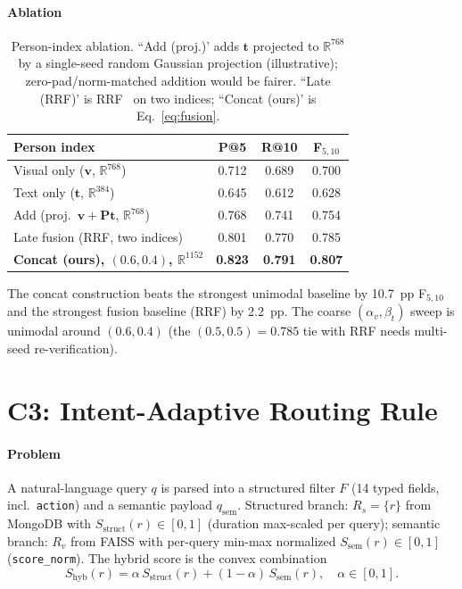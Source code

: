 ﻿\documentclass[conference]{IEEEtran}
\theoremstyle{plain}
\begin{document}
\paragraph*{Ablation}
\begin{table}[!t]
\caption{Person-index ablation. ``Add (proj.)' adds $\mathbf{t}$ projected to $\mathbb{R}^{768}$ by a single-seed random Gaussian projection (illustrative); zero-pad/norm-matched addition would be fairer. ``Late (RRF)' is RRF~\cite{b27} on two indices; ``Concat (ours)' is Eq.~\eqref{eq:fusion}.}
\label{tab:fusion_ablation}
\centering
\footnotesize
\begin{tabular}{@{}lccc@{}}
\toprule
Person index & P@5 & R@10 & F$_{5,10}$ \\
\midrule
Visual only ($\mathbf{v}$, $\mathbb{R}^{768}$) & 0.712 & 0.689 & 0.700 \\
Text only ($\mathbf{t}$, $\mathbb{R}^{384}$) & 0.645 & 0.612 & 0.628 \\
Add (proj.\ $\mathbf{v}+\mathbf{P}\mathbf{t}$, $\mathbb{R}^{768}$) & 0.768 & 0.741 & 0.754 \\
Late fusion (RRF, two indices) & 0.801 & 0.770 & 0.785 \\
\textbf{Concat (ours), $(0.6,0.4)$, $\mathbb{R}^{1152}$} & \textbf{0.823} & \textbf{0.791} & \textbf{0.807} \\
\bottomrule
\end{tabular}
\end{table}
The concat construction beats the strongest unimodal baseline by 10.7~pp F$_{5,10}$ and the strongest fusion baseline (RRF) by 2.2~pp. The coarse $(\alpha_v,\beta_t)$ sweep is unimodal around $(0.6,0.4)$ (the $(0.5,0.5){=}0.785$ tie with RRF needs multi-seed re-verification).







\section{C3: Intent-Adaptive Routing Rule}\label{sec:adaptive_alpha}

\paragraph*{Problem}
A natural-language query $q$ is parsed into a structured filter $F$ (14 typed fields, incl.\ \texttt{action}) and a semantic payload $q_{\text{sem}}$. Structured branch: $R_s=\{r\}$ from MongoDB with $S_{\text{struct}}(r)\in[0,1]$ (duration max-scaled per query); semantic branch: $R_v$ from FAISS with per-query min-max normalized $S_{\text{sem}}(r)\in[0,1]$ (\texttt{score\_norm}). The hybrid score is the convex combination
\begin{equation}
S_{\text{hyb}}(r) = \alpha\, S_{\text{struct}}(r) + (1-\alpha)\, S_{\text{sem}}(r),\quad \alpha\in[0,1].
\label{eq:hybrid_score}
\end{equation}
\end{document}
